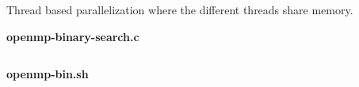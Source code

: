 \begin{usecases}
    Thread based parallelization where the different threads share memory. 
\end{usecases}

\begin{example}
    \noindent\textbf{openmp-binary-search.c}\vspace{-0.5em}
    \inputminted{c}{source_code/OpenMP/openmp-binary-search.c}

    \noindent\textbf{openmp-bin.sh}\vspace{-0.5em}
    \inputminted{bash}{source_code/OpenMP/openmp-bin.sh}
\end{example}